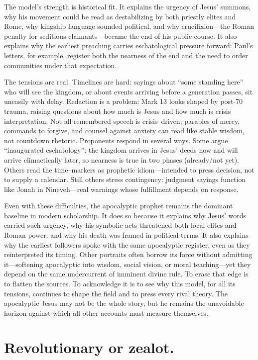 The model’s strength is historical fit.
It explains the urgency of Jesus’ summons, why his movement could be read as destabilizing by both priestly elites and Rome, why kingship language sounded political, and why crucifixion—the Roman penalty for seditious claimants—became the end of his public course.
It also explains why the earliest preaching carries eschatological pressure forward: Paul’s letters, for example, register both the nearness of the end and the need to order communities under that expectation.

The tensions are real.
Timelines are hard: sayings about “some standing here” who will see the kingdom, or about events arriving before a generation passes, sit uneasily with delay.
Redaction is a problem: Mark 13 looks shaped by post-70 trauma, raising questions about how much is Jesus and how much is crisis interpretation.
Not all remembered speech is crisis–driven; parables of mercy, commands to forgive, and counsel against anxiety can read like stable wisdom, not countdown rhetoric.
Proponents respond in several ways.
Some argue “inaugurated eschatology”: the kingdom arrives in Jesus’ deeds now and will arrive climactically later, so nearness is true in two phases (already/not yet).
Others read the time–markers as prophetic idiom—intended to press decision, not to supply a calendar.
Still others stress contingency: judgment sayings function like Jonah in Nineveh—real warnings whose fulfillment depends on response.

Even with these difficulties, the apocalyptic prophet remains the dominant baseline in modern scholarship.
It does so because it explains why Jesus’ words carried such urgency, why his symbolic acts threatened both local elites and Roman power, and why his death was framed in political terms.
It also explains why the earliest followers spoke with the same apocalyptic register, even as they reinterpreted its timing.
Other portraits often borrow its force without admitting it—softening apocalyptic into wisdom, social vision, or moral teaching—yet they depend on the same undercurrent of imminent divine rule.
To erase that edge is to flatten the sources.
To acknowledge it is to see why this model, for all its tensions, continues to shape the field and to press every rival theory.
The apocalyptic Jesus may not be the whole story, but he remains the unavoidable horizon against which all other accounts must measure themselves.

\section{Revolutionary or zealot.}\label{sec:revolutionary}

